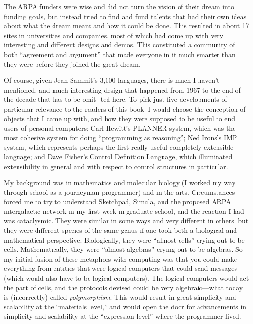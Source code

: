 \documentclass[a4paper,10pt,twoside]{book}
\begin{document}
The ARPA funders were wise and did not turn the vision of their dream into funding goals, 
but instead tried to find and fund talents that had their own ideas about what the dream meant 
and how it could be done. This resulted in about 17 sites in universities and companies, most of 
which had come up with very interesting and different designs and demos. This constituted a 
community of both “agreement and argument” that made everyone in it much smarter than 
they were before they joined the great dream. 

Of course, given Jean Sammit’s 3,000 languages, there is much I haven’t mentioned, and 
much interesting design that happened from 1967 to the end of the decade that has to be omit- 
ted here. To pick just five developments of particular relevance to the readers of this book, I 
would choose the conception of objects that I came up with, and how they were supposed to be 
useful to end users of personal computers; Carl Hewitt’s PLANNER system, which was the most 
cohesive system for doing “programming as reasoning”; Ned Irons’s IMP system, which represents perhaps the first really useful completely extensible language; and Dave Fisher’s Control 
Definition Language, which illuminated extensibility in general and with respect to control 
structures in particular. 


My background was in mathematics and molecular biology (I worked my way through 
school as a journeyman programmer) and in the arts. Circumstances forced me to try to 
understand Sketchpad, Simula, and the proposed ARPA intergalactic network in my first week 
in graduate school, and the reaction I had was cataclysmic. They were similar in some ways 
and very different in others, but they were different species of the same genus if one took both 
a biological and mathematical perspective. Biologically, they were “almost cells” crying out to 
be cells. Mathematically, they were “almost algebras” crying out to be algebras. So my initial 
fusion of these metaphors with computing was that you could make everything from entities 
that were logical computers that could send messages (which would also have to be logical 
computers). The logical computers would act the part of cells, and the protocols devised could 
be very algebraic—what today is (incorrectly) called \emph{polymorphism}. This would result in great 
simplicity and scalability at the “materials level,” and would open the door for advancements 
in simplicity and scalability at the “expression level” where the programmer lived. 
\end{document}
